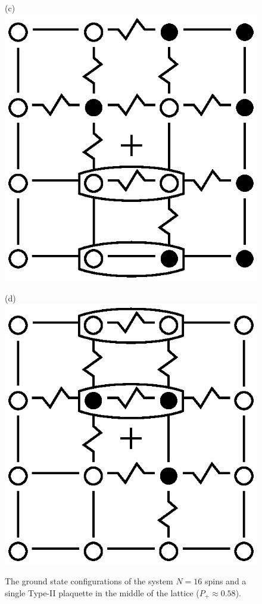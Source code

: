 \documentclass[preprint,12pt]{elsarticle}
\begin{document}
\begin{figure}[H]
\begin{minipage}[h]{0.2\linewidth}
		\end{minipage}
		\hfill
		\begin{minipage}[h]{0.2\linewidth}
			\centering(c)
			\includegraphics[width=1\linewidth]{pictures/Cl1_Type2_gs3.eps}
		\end{minipage}
		\hfill
		\begin{minipage}[h]{0.2\linewidth}
			\centering(d)
			\includegraphics[width=1\linewidth]{pictures/Cl1_Type2_gs4.eps}
		\end{minipage}
		\caption{The ground state configurations of the system $N=16$ spins and a single Type-II plaquette in the middle of the lattice ($P_+\approx0.58$).}
		\label{fig:4x4.1}
		

\end{figure}
\end{document}

